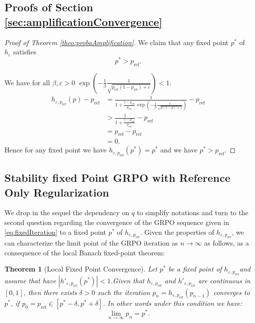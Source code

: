 \documentclass[11pt,reqno]{amsart}
\newtheorem{theorem}{Theorem}
\begin{document}
\subsection{Proofs of Section \ref{sec:amplificationConvergence} }

\begin{proof}[Proof of Theorem \ref{theo:probaAmplification}]
We claim that any fixed point \(p^*\) of \(h_\varepsilon\) satisfies
\[
p^*>p_{\mathrm{ref}}.
\]


We have for all $\beta,\varepsilon >0$ $\exp\!\left(-\frac{1}{\beta}\frac{1}{\sqrt{p_{\mathrm{ref}}(1-p_{\mathrm{ref}})+\varepsilon}}\right) <1$.
\begin{align*}
h_{\varepsilon,p_{\mathrm{ref}}}(p)-p_{\mathrm{ref}}&=\frac{1}{1+\frac{1-p_{\mathrm{ref}}}{p_{\mathrm{ref}}}\,\exp\!\left(-\frac{1}{\beta}\frac{1}{\sqrt{p(1-p)+\varepsilon}}\right)}- p_{\mathrm{ref}}\\
&>\frac{1}{1+\frac{1-p_{\mathrm{ref}}}{p_{\mathrm{ref}}}} -p_{\mathrm{ref}}\\
& = p_{\mathrm{ref}}- p_{\mathrm{ref}}\\
& =0.
\end{align*}
Hence for any fixed point we have $h_{\varepsilon,p_{\mathrm{ref}}}(p^*)=p^*$ and we have $p^*>p_{\mathrm{ref}}.$
\end{proof}
\subsection{Stability fixed Point GRPO with Reference Only Regularization } \label{sec:refonly}
We drop in the sequel the dependency on $q$ to simplify notations and turn to the second question regarding the convergence of the GRPO sequence given in \eqref{eq:fixedIteration} to a fixed point \( p^* \) of \( h_{\varepsilon, p_{\mathrm{ref}}} \). Given the properties of \( h_{\varepsilon, p_{\mathrm{ref}}} \), we can characterize the limit point of the GRPO iteration as \( n \to \infty \) as follows, as a consequence of the local Banach fixed-point theorem:




\begin{theorem}[Local Fixed Point Convergence] Let $p^*$ be a fixed point of $h_{\varepsilon,p_{\mathrm{ref}}}$and assume that have $|h'_{\varepsilon,p_{\mathrm{ref}}}(p^*)|<1$.Given that $h_{\varepsilon,p_{\mathrm{ref}}}$ and $h'_{\varepsilon,p_{\mathrm{ref}}}$ are continuous in $[0,1]$, then there exists $\delta>0$ such the iteration $p_{n} = h_{\varepsilon,p_{\mathrm{ref}}}(p_{n-1})$ converges to $p^*$, if $p_0 =p_{\mathrm{ref}} \in [p^*-\delta, p^*+\delta]$. In other words under this condition we have: 
$$\lim _{n\to \infty} p_{n}  = p^*.$$
\label{theo:convergence}
\end{theorem}
\end{document}
